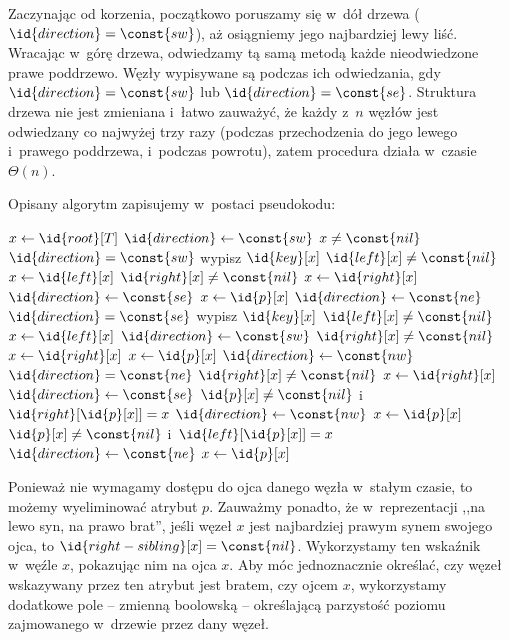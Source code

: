 Zaczynając od korzenia, początkowo poruszamy się w~dół drzewa ($\id{direction}=\const{sw}$), aż osiągniemy jego najbardziej lewy liść. Wracając w~górę drzewa, odwiedzamy tą samą metodą każde nieodwiedzone prawe poddrzewo. Węzły wypisywane są podczas ich odwiedzania, gdy $\id{direction}=\const{sw}$ lub $\id{direction}=\const{se}$. Struktura drzewa nie jest zmieniana i~łatwo zauważyć, że każdy z~$n$ węzłów jest odwiedzany co najwyżej trzy razy (podczas przechodzenia do jego lewego i~prawego poddrzewa, i~podczas powrotu), zatem procedura działa w~czasie $\Theta(n)$.

Opisany algorytm zapisujemy w~postaci pseudokodu:
\begin{codebox}
\li	$x\gets\id{root}[T]$
\li	$\id{direction}\gets\const{sw}$
\li	\While $x\ne\const{nil}$
\li		\Do
			\If $\id{direction}=\const{sw}$
\li				\Then
					wypisz $\id{key}[x]$
\li					\If $\id{left}[x]\ne\const{nil}$
\li						\Then $x\gets\id{left}[x]$
\li					\ElseIf $\id{right}[x]\ne\const{nil}$
\li						\Then
							$x\gets\id{right}[x]$
\li							$\id{direction}\gets\const{se}$
\li					\ElseNoIf $x\gets\id{p}[x]$
						\End
\li						{} $\id{direction}\gets\const{ne}$
\li			\ElseIf $\id{direction}=\const{se}$
\li				\Then
					wypisz $\id{key}[x]$
\li					\If $\id{left}[x]\ne\const{nil}$
\li						\Then
							$x\gets\id{left}[x]$
\li							$\id{direction}\gets\const{sw}$
\li					\ElseIf $\id{right}[x]\ne\const{nil}$
\li						\Then $x\gets\id{right}[x]$
\li					\ElseNoIf $x\gets\id{p}[x]$
						\End
\li						{} $\id{direction}\gets\const{nw}$
\li			\ElseIf $\id{direction}=\const{ne}$
\li				\Then
					\If $\id{right}[x]\ne\const{nil}$
\li						\Then
							$x\gets\id{right}[x]$
\li							$\id{direction}\gets\const{se}$
\li						\Else
							\If $\id{p}[x]\ne\const{nil}$ i~$\id{right}[\id{p}[x]]=x$
\li								\Then $\id{direction}\gets\const{nw}$
								\End
\li							$x\gets\id{p}[x]$
						\End
\li			\ElseNoIf \If $\id{p}[x]\ne\const{nil}$ i~$\id{left}[\id{p}[x]]=x$
				\End
\li				{}  $\id{direction}\gets\const{ne}$
\li				{} $x\gets\id{p}[x]$
		\End
\end{codebox}

\exercise %
Ponieważ nie wymagamy dostępu do ojca danego węzła w~stałym czasie, to możemy wyeliminować atrybut $p$. Zauważmy ponadto, że w~reprezentacji ,,na lewo syn, na prawo brat'', jeśli węzeł $x$ jest najbardziej prawym synem swojego ojca, to $\id{right-sibling}[x]=\const{nil}$. Wykorzystamy ten wskaźnik w~węźle $x$, pokazując nim na ojca $x$. Aby móc jednoznacznie określać, czy węzeł wskazywany przez ten atrybut jest bratem, czy ojcem $x$, wykorzystamy dodatkowe pole -- zmienną boolowską -- określającą parzystość poziomu zajmowanego w~drzewie przez dany węzeł.

